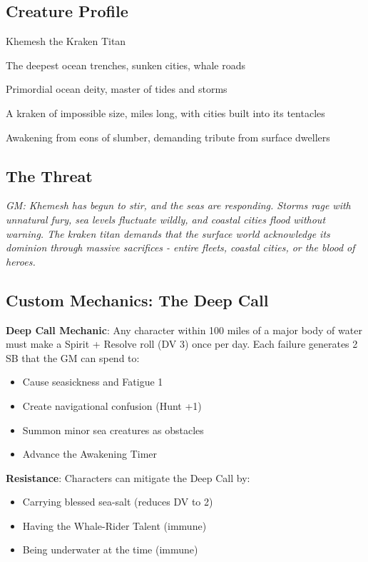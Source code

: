 \documentclass[11pt]{article}
\newcommand{\gm}[1]{\textit{GM: #1}}
\begin{document}
\subsection*{Creature Profile}

\begin{description}[leftmargin=*]
\item[Name] Khemesh the Kraken Titan
\item[Domain] The deepest ocean trenches, sunken cities, whale roads
\item[Nature] Primordial ocean deity, master of tides and storms
\item[Appearance] A kraken of impossible size, miles long, with cities built into its tentacles
\item[Motivation] Awakening from eons of slumber, demanding tribute from surface dwellers
\end{description}

\subsection*{The Threat}

\gm{Khemesh has begun to stir, and the seas are responding. Storms rage with unnatural fury, sea levels fluctuate wildly, and coastal cities flood without warning. The kraken titan demands that the surface world acknowledge its dominion through massive sacrifices - entire fleets, coastal cities, or the blood of heroes.}

\subsection*{Custom Mechanics: The Deep Call}

\begin{mdframed}[backgroundcolor=mechanicbg]
\textbf{Deep Call Mechanic}: Any character within 100 miles of a major body of water must make a Spirit + Resolve roll (DV 3) once per day. Each failure generates 2 SB that the GM can spend to:
\begin{itemize}[leftmargin=*]
\item Cause seasickness and Fatigue 1
\item Create navigational confusion (Hunt +1)
\item Summon minor sea creatures as obstacles
\item Advance the Awakening Timer 
\end{itemize}

\textbf{Resistance}: Characters can mitigate the Deep Call by:
\begin{itemize}[leftmargin=*]
\item Carrying blessed sea-salt (reduces DV to 2)
\item Having the Whale-Rider Talent (immune)
\item Being underwater at the time (immune)
\end{itemize}
\end{mdframed}
\end{document}
